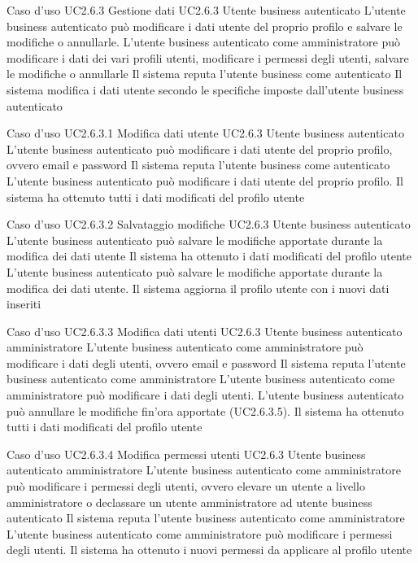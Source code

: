 \UCtitle
{Caso d'uso UC2.6.3}
{Gestione dati}
\UC
{UC2.6.3}
{Utente business autenticato}
{L'utente business autenticato può modificare i dati utente del proprio profilo e salvare le modifiche o annullarle. L'utente business autenticato come amministratore può modificare i dati dei vari profili utenti, modificare i permessi degli utenti, salvare le modifiche o annullarle}
{Il sistema reputa l'utente business come autenticato}
\post
{Il sistema modifica i dati utente secondo le specifiche imposte dall'utente business autenticato}

\UCtitle
{Caso d'uso UC2.6.3.1}
{Modifica dati utente}
\UC
{UC2.6.3}
{Utente business autenticato}
{L'utente business autenticato può modificare i dati utente del proprio profilo, ovvero email e password}
{Il sistema reputa l'utente business come autenticato}
\scenario
{L'utente business autenticato può modificare i dati utente del proprio profilo.}
\post
{Il sistema ha ottenuto tutti i dati modificati del profilo utente}

\UCtitle
{Caso d'uso UC2.6.3.2}
{Salvataggio modifiche}
\UC
{UC2.6.3}
{Utente business autenticato}
{L'utente business autenticato può salvare le modifiche apportate durante la modifica dei dati utente}
{Il sistema ha ottenuto i dati modificati del profilo utente}
\scenario
{L'utente business autenticato può salvare le modifiche apportate durante la modifica dei dati utente.}
\post
{Il sistema aggiorna il profilo utente con i nuovi dati inseriti}

\UCtitle
{Caso d'uso UC2.6.3.3}
{Modifica dati utenti}
\UC
{UC2.6.3}
{Utente business autenticato amministratore}
{L'utente business autenticato come amministratore può modificare i dati degli utenti, ovvero email e password}
{Il sistema reputa l'utente business autenticato come amministratore}
\scenario
{L'utente business autenticato come amministratore può modificare i dati degli utenti.}
\estensioni
{L'utente business autenticato può annullare le modifiche fin'ora apportate (UC2.6.3.5).}
\post
{Il sistema ha ottenuto tutti i dati modificati del profilo utente}

\UCtitle
{Caso d'uso UC2.6.3.4}
{Modifica permessi utenti}
\UC
{UC2.6.3}
{Utente business autenticato amministratore}
{L'utente business autenticato come amministratore può modificare i permessi degli utenti, ovvero elevare un utente a livello amministratore o declassare un utente amministratore ad utente business autenticato}
{Il sistema reputa l'utente business autenticato come amministratore}
\scenario
{L'utente business autenticato come amministratore può modificare i permessi degli utenti.}
\post
{Il sistema ha ottenuto i nuovi permessi da applicare al profilo utente}

